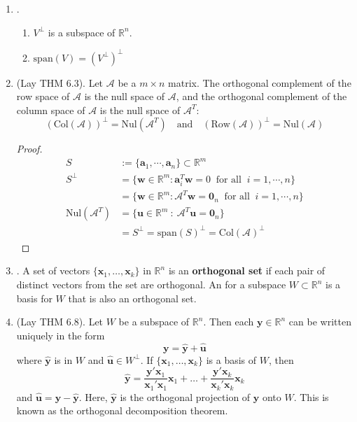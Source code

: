 \documentclass[12pt]{article}
\begin{document}
\begin{enumerate}
\begin{enumerate}
		\item\underline{}.
			\begin{enumerate}
				\item $V^\perp$ is a subspace of $\mathbb{R}^n$. 
				\item $\text{span}(V) = (V^\perp)^\perp$
			\end{enumerate}

		\item\underline{} (Lay THM 6.3).
			Let $\mathcal{A}$ be a $m\times n$ matrix. The orthogonal complement of the row space of $\mathcal{A}$ is the null space of $\mathcal{A}$, and the orthogonal
			complement of the column space of $\mathcal{A}$ is the null space of $\mathcal{A}^T$:
				\[(\text{Col}(\mathcal{A}))^\perp=\text{Nul}(\mathcal{A}^T)\quad\text{and}\quad(\text{Row}(\mathcal{A}))^\perp = \text{Nul}(\mathcal{A})\]
			\begin{proof}
				\begin{align*}
					S &:= \{\mathbf{a}_1, \cdots, \mathbf{a}_n \} \subset \mathbb{R}^m  \\
					S^{\perp} &= \{\mathbf{w} \in \mathbb{R}^m : \mathbf{a}_i^T \mathbf{w} = 0 \ \mbox{ for all } \ i=1, \cdots, n \} \\
						&= \{\mathbf{w} \in \mathbb{R}^m : \mathcal{A}^T \mathbf{w} = \mathbf{0}_n \ \mbox{ for all } \ i=1, \cdots, n \} \\ 
					\text{Nul}(\mathcal{A}^T) &= \{ \mathbf{u} \in \mathbb{R}^m  \ : \ \mathcal{A}^T \mathbf{u} = \mathbf{0}_n  \} \\ 
						& = S^\perp  = \text{span}(S)^\perp = \text{Col}(\mathcal{A})^\perp
				\end{align*}
			\end{proof}
			
			\item\underline{}.
		A set of vectors $\{\mathbf{x}_1,\dots,\mathbf{x}_k\}$ in $\mathbb{R}^n$ is an \textbf{orthogonal set} if each pair of distinct
		vectors from the set are orthogonal. An  for a subspace $W\subset\mathbb{R}^n$ is a basis for $W$
		that is also an orthogonal set.
		
		\item\underline{} (Lay THM 6.8).
		Let $W$ be a subspace of $\mathbb{R}^n$.
		Then each $\mathbf{y}\in\mathbb{R}^n$ can be written uniquely in the form
		\[\mathbf{y}=\hat{\mathbf{y}}+\hat{\mathbf{u}}\]
		where $\hat{\mathbf{y}}$ is in $W$ and $\hat{\mathbf{u}}\in W^{\perp}$. If $\{\mathbf{x}_1,\dots,\mathbf{x}_k\}$ is a
		basis of $W$, then
		\[\hat{\mathbf{y}}=\frac{\mathbf{y}'\mathbf{x}_1}{\mathbf{x}_1'\mathbf{x}_1}\mathbf{x}_1
		+\dots + \frac{\mathbf{y}'\mathbf{x}_k}{\mathbf{x}_k'\mathbf{x}_k}\mathbf{x}_k\]
		and $\hat{\mathbf{u}}=\mathbf{y}-\hat{\mathbf{y}}$. Here, $\hat{\mathbf{y}}$ is the orthogonal projection of $\mathbf{y}$
		onto $W$. This is known as the orthogonal decomposition theorem.
		

\end{enumerate}
\end{enumerate}
\end{document}

